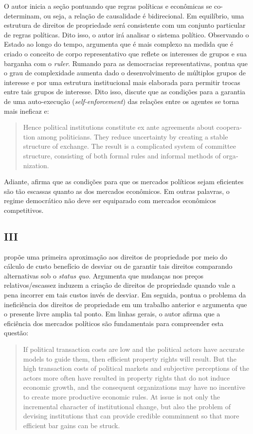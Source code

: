 O autor inicia a seção pontuando que regras políticas e econômicas se co-determinam, ou seja, a relação de causalidade é bidirecional. Em equilíbrio, uma estrutura de direitos de propriedade será consistente com um conjunto particular de regras políticas. Dito isso, o autor irá analisar o sistema político. Observando o Estado ao longo do tempo, argumenta que é mais complexo na medida que é criado o conceito de corpo representativo que reflete os interesses de grupos e sua barganha com o \textit{ruler}. Rumando para as democracias representativas, pontua que o grau de complexidade aumenta dado o desenvolvimento de múltiplos grupos de interesse e por uma estrutura institucional mais elaborada para permitir trocas entre tais grupos de interesse. Dito isso, discute que as condições para a garantia de uma auto-execução (\textit{self-enforcement}) das relações entre os agentes se torna mais ineficaz e:

\begin{quote}
	Hence political institutions constitute ex ante agreements about coopera­tion among politicians. They reduce uncertainty by creating a stable
	structure of exchange. The result is a complicated system of committee
	structure, consisting of both formal rules and informal methods of orga­nization.
\end{quote}
Adiante, afirma que as condições para que os mercados políticos sejam eficientes são tão escassas quanto as dos mercados econômicos. Em outras palavras, o regime democrático não deve ser equiparado com mercados econômicos competitivos.

\subsection*{III}

\autor propõe uma primeira aproximação aos direitos de propriedade por meio do cálculo de custo benefício de desviar ou de garantir tais direitos comparando alternativas sob o \textit{status quo}. Argumenta que mudanças nos preços relativos/escassez induzem a criação de direitos de propriedade quando vale a pena incorrer em tais custos invés de desviar. Em seguida, pontua o problema da ineficiência dos direitos de propriedade em um trabalho anterior e argumenta que o presente livre amplia tal ponto. Em linhas gerais, o autor afirma que a eficiência dos mercados políticos são fundamentais para compreender esta questão:

\begin{quote}
	If political
	transaction costs are low and the political actors have accurate models to
	guide them, then efficient property rights will result. But the high transac­tion costs of political markets and subjective perceptions of the actors
	more often have resulted in property rights that do not induce economic
	growth, and the consequent organizations may have no incentive to create
	more productive economic rules. At issue is not only the incremental
	character of institutional change, but also the problem of devising institu­tions that can provide credible comminnent so that more efficient bar­
	gains can be struck.
\end{quote}

